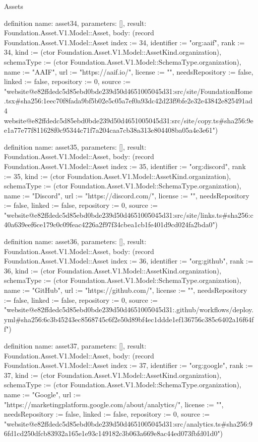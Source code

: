 \begin{lexlean}{Assets}
\begin{semanticmodule}
definition{
  name: asset34,
  parameters: [],
  result: Foundation.Asset.V1.Model::Asset,
  body: (record Foundation.Asset.V1.Model::Asset {index := 34, identifier := "org:aaif", rank := 34, kind := (ctor Foundation.Asset.V1.Model::AssetKind.organization), schemaType := (ctor Foundation.Asset.V1.Model::SchemaType.organization), name := "AAIF", url := "https://aaif.io/", license := "", needsRepository := false, linked := false, repository := 0, source := "website@e82ffdedc5d85ebd0bde239d50d4651005045d31:src/site/FoundationHome.tsx#sha256:1eec70f8fada9bf5b02e5c05a7ef0a93dc42d23f9bfe2e32e43842e825491ad4 website@e82ffdedc5d85ebd0bde239d50d4651005045d31:src/site/copy.ts#sha256:9ee1a77e77f811628f0c95344c71f7a204caa7cb38a313e804408ba05a4e3e61"})
}

definition{
  name: asset35,
  parameters: [],
  result: Foundation.Asset.V1.Model::Asset,
  body: (record Foundation.Asset.V1.Model::Asset {index := 35, identifier := "org:discord", rank := 35, kind := (ctor Foundation.Asset.V1.Model::AssetKind.organization), schemaType := (ctor Foundation.Asset.V1.Model::SchemaType.organization), name := "Discord", url := "https://discord.com/", license := "", needsRepository := false, linked := false, repository := 0, source := "website@e82ffdedc5d85ebd0bde239d50d4651005045d31:src/site/links.ts#sha256:c40a639eef6ce179c0c09feac4226a2f97f34cbea1cb1fe401d9cd024fa2bda0"})
}

definition{
  name: asset36,
  parameters: [],
  result: Foundation.Asset.V1.Model::Asset,
  body: (record Foundation.Asset.V1.Model::Asset {index := 36, identifier := "org:github", rank := 36, kind := (ctor Foundation.Asset.V1.Model::AssetKind.organization), schemaType := (ctor Foundation.Asset.V1.Model::SchemaType.organization), name := "GitHub", url := "https://github.com/", license := "", needsRepository := false, linked := false, repository := 0, source := "website@e82ffdedc5d85ebd0bde239d50d4651005045d31:.github/workflows/deploy.yml#sha256:6c3b45243ec8568745c6f2e50d89bf4ec1ddde1ef136756c385c6402a16f64ff"})
}

definition{
  name: asset37,
  parameters: [],
  result: Foundation.Asset.V1.Model::Asset,
  body: (record Foundation.Asset.V1.Model::Asset {index := 37, identifier := "org:google", rank := 37, kind := (ctor Foundation.Asset.V1.Model::AssetKind.organization), schemaType := (ctor Foundation.Asset.V1.Model::SchemaType.organization), name := "Google", url := "https://marketingplatform.google.com/about/analytics/", license := "", needsRepository := false, linked := false, repository := 0, source := "website@e82ffdedc5d85ebd0bde239d50d4651005045d31:src/analytics.ts#sha256:96fd1cd250dfcb83932a165e1e93c149182c3b063a669e8ac44ed073fbfd01d0"})
}


\end{semanticmodule}
\end{lexlean}
